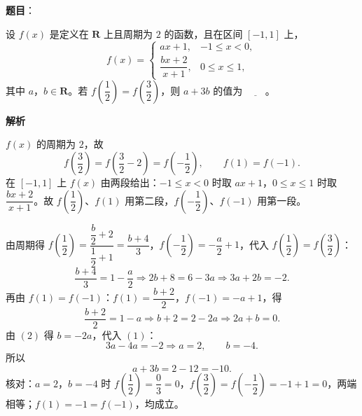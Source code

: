 \begin{answer}

\textbf{题目}：

设 $f(x)$ 是定义在 $\mathbf R$ 上且周期为 $2$ 的函数，且在区间 $[-1,1]$ 上，
\nopagebreak[4]
\[f(x)=\begin{cases}ax+1,&-1\leqslant x<0,\\[2pt]\dfrac{bx+2}{x+1},&0\leqslant x\leqslant1,\end{cases}\]
其中 $a$，$b\in\mathbf R$。若 $f\left(\dfrac12\right)=f\left(\dfrac32\right)$，则 $a+3b$ 的值为 $\underline{\qquad}$。

\textbf{解析}

$f(x)$ 的周期为 $2$，故
\nopagebreak[4]
\[f\left(\frac32\right)=f\left(\frac32-2\right)=f\left(-\frac12\right),\qquad f(1)=f(-1).\]
在 $[-1,1]$ 上 $f(x)$ 由两段给出：$-1\leqslant x<0$ 时取 $ax+1$，$0\leqslant x\leqslant1$ 时取 $\dfrac{bx+2}{x+1}$。故 $f\left(\dfrac12\right)$、$f(1)$ 用第二段，$f\left(-\dfrac12\right)$、$f(-1)$ 用第一段。

由周期得 $f\left(\dfrac12\right)=\dfrac{\dfrac b2+2}{\dfrac12+1}=\dfrac{b+4}{3}$，$f\left(-\dfrac12\right)=-\dfrac a2+1$，代入 $f\left(\dfrac12\right)=f\left(\dfrac32\right)$：
\nopagebreak[4]
\[\frac{b+4}{3}=1-\frac a2\Longrightarrow2b+8=6-3a\Longrightarrow3a+2b=-2. \tag{1}\]
再由 $f(1)=f(-1)$：$f(1)=\dfrac{b+2}{2}$，$f(-1)=-a+1$，得
\nopagebreak[4]
\[\frac{b+2}{2}=1-a\Longrightarrow b+2=2-2a\Longrightarrow2a+b=0. \tag{2}\]
由 $(2)$ 得 $b=-2a$，代入 $(1)$：
\nopagebreak[4]
\[3a-4a=-2\Longrightarrow a=2,\qquad b=-4.\]
所以
\nopagebreak[4]
\[a+3b=2-12=-10.\]
核对：$a=2$，$b=-4$ 时 $f\left(\dfrac12\right)=\dfrac{0}{3}=0$，$f\left(\dfrac32\right)=f\left(-\dfrac12\right)=-1+1=0$，两端相等；$f(1)=-1=f(-1)$，均成立。


\end{answer}
